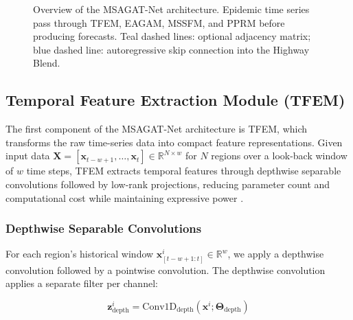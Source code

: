 \documentclass[final,1p,times]{elsarticle}
\begin{document}
\begin{figure}[!htbp]
{%
    }
    \caption{Overview of the MSAGAT-Net architecture. Epidemic time series pass through TFEM, EAGAM, MSSFM, and PPRM before producing forecasts. Teal dashed lines: optional adjacency matrix; blue dashed line: autoregressive skip connection into the Highway Blend.}
    \label{fig:msagat_net_architecture}
\end{figure}

\subsection{Temporal Feature Extraction Module (TFEM)}

The first component of the MSAGAT-Net architecture is TFEM, which transforms the raw time-series data into compact feature representations. Given input data $\mathbf{X} = [\mathbf{x}_{t-w+1}, \ldots, \mathbf{x}_t] \in \mathbb{R}^{N \times w}$ for $N$ regions over a look-back window of $w$ time steps, TFEM extracts temporal features through depthwise separable convolutions \cite{chollet2017xception} followed by low-rank projections, reducing parameter count and computational cost while maintaining expressive power \cite{li2023multi, yu2022traffic}.

\subsubsection{Depthwise Separable Convolutions}

For each region's historical window $\mathbf{x}^i_{[t-w+1:t]} \in \mathbb{R}^w$, we apply a depthwise convolution followed by a pointwise convolution. The depthwise convolution applies a separate filter per channel:

\begin{equation}
\mathbf{z}^i_{\text{depth}} = \text{Conv1D}_{\text{depth}}(\mathbf{x}^i; \boldsymbol{\Theta}_{\text{depth}})
\end{equation}
\end{document}
